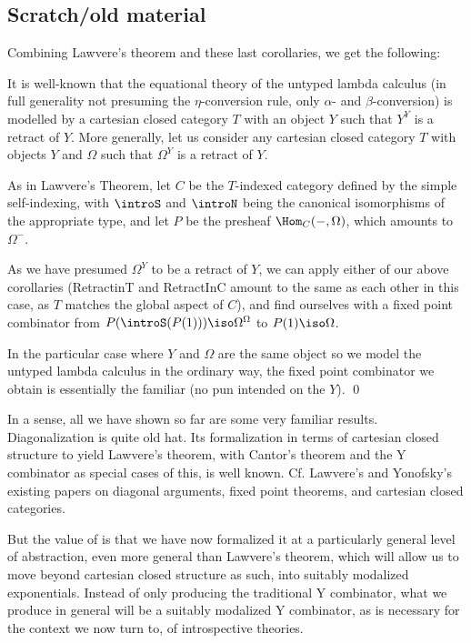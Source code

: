 \subsection{Scratch/old material}
Combining Lawvere's theorem and these last corollaries, we get the following:

\label{YCombinator}
It is well-known that the equational theory of the untyped lambda calculus (in full generality not presuming the $\eta$-conversion rule, only $\alpha$- and $\beta$-conversion) is modelled by a cartesian closed category $T$ with an object $Y$ such that $Y^Y$ is a retract of $Y$. More generally, let us consider any cartesian closed category $T$ with objects $Y$ and $\Omega$ such that $\Omega^Y$ is a retract of $Y$.

As in Lawvere's Theorem, let $C$ be the $T$-indexed category defined by the simple self-indexing, with $\introS$ and $\introN$ being the canonical isomorphisms of the appropriate type, and let $P$ be the presheaf $\Hom_C(-, \Omega)$, which amounts to $\Omega^{-}$.

As we have presumed $\Omega^Y$ to be a retract of $Y$, we can apply either of our above corollaries (RetractinT and RetractInC amount to the same as each other in this case, as $T$ matches the global aspect of $C$), and find ourselves with a fixed point combinator from $P(\introS(P(1))) \iso \Omega^{\Omega}$ to $P(1) \iso \Omega$. 

In the particular case where $Y$ and $\Omega$ are the same object so we model the untyped lambda calculus in the ordinary way, the fixed point combinator we obtain is essentially the familiar  (no pun intended on the $Y$). \qed
{}

In a sense, all we have shown so far are some very familiar results. Diagonalization is quite old hat. Its formalization in terms of cartesian closed structure to yield Lawvere's theorem, with Cantor's theorem and the Y combinator as special cases of this, is well known. Cf. Lawvere's and Yonofsky's existing papers on diagonal arguments, fixed point theorems, and cartesian closed categories. 

But the value of  is that we have now formalized it at a particularly general level of abstraction, even more general than Lawvere's theorem, which will allow us to move beyond cartesian closed structure as such, into suitably modalized exponentials. Instead of only producing the traditional Y combinator, what we produce in general will be a suitably modalized Y combinator, as is necessary for the context we now turn to, of introspective theories.

